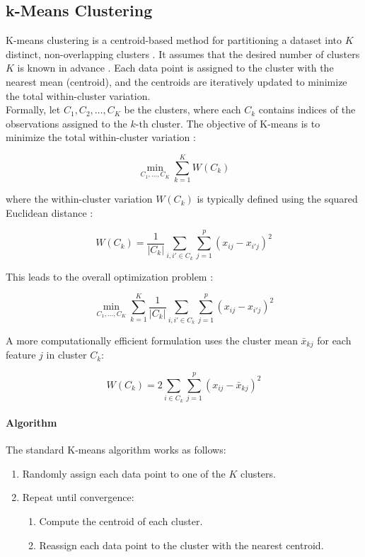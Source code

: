 \documentclass[conference]{IEEEtran}
\begin{document}
\subsection{k-Means Clustering}
K-means clustering is a centroid-based method for partitioning a dataset into \( K \) distinct, non-overlapping clusters \cite{ikotun2023kmeans}. It assumes that the desired number of clusters \( K \) is known in advance \cite{clusters}. Each data point is assigned to the cluster with the nearest mean (centroid), and the centroids are iteratively updated to minimize the total within-cluster variation. \\

Formally, let \( C_1, C_2, \ldots, C_K \) be the clusters, where each \( C_k \) contains indices of the observations assigned to the \( k \)-th cluster. The objective of K-means is to minimize the total within-cluster variation \cite{James2021}:

\[
\min_{C_1, \ldots, C_K} \sum_{k=1}^K W(C_k)
\]

where the within-cluster variation \( W(C_k) \) is typically defined using the squared Euclidean distance :

\[
W(C_k) = \frac{1}{|C_k|} \sum_{i, i' \in C_k} \sum_{j=1}^p (x_{ij} - x_{i'j})^2
\]

This leads to the overall optimization problem \cite{James2021}:

\[
\min_{C_1, \ldots, C_K} \sum_{k=1}^K \frac{1}{|C_k|} \sum_{i, i' \in C_k} \sum_{j=1}^p (x_{ij} - x_{i'j})^2
\]

A more computationally efficient formulation uses the cluster mean \( \bar{x}_{kj} \) for each feature \( j \) in cluster \( C_k \):

\[
W(C_k) = 2 \sum_{i \in C_k} \sum_{j=1}^p (x_{ij} - \bar{x}_{kj})^2
\]

\paragraph{Algorithm}
The standard K-means algorithm works as follows:

\begin{enumerate}
    \item Randomly assign each data point to one of the \( K \) clusters.
    \item Repeat until convergence:
        \begin{enumerate}
            \item Compute the centroid of each cluster.
            \item Reassign each data point to the cluster with the nearest centroid.
        \end{enumerate}
\end{enumerate}
\end{document}
